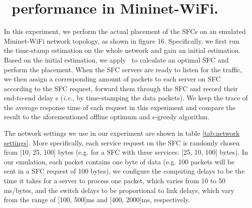


\section{\myalgorithm\ performance in Mininet-WiFi.}
\label{sec:mininetwifilearningbehavior}
In this experiment, we perform the actual placement of the SFCs on an emulated Mininet-WiFi network topology, as shown in figure 16. Specifically, we first run the time-stamp estimation on the whole network and gain an initial estimation. Based on the initial estimation, we apply \myalgorithm\ to calculate an optimal SFC and perform the placement. When the SFC servers are ready to listen for the traffic, we then assign a corresponding amount of packets to each server on SFC according to the SFC request, forward them through the SFC and record their end-to-end delay s (\textit{i.e.}, by time-stamping the data packets). We keep the trace of the average response time of each request in this experiment and compare the result to the aforementioned offline optimum and $\epsilon$-greedy algorithm. 

The network settings we use in our experiment are shown in table \ref{tab:network settings}. More specifically, each service request on the SFC is randomly chosen from [10, 25, 100] bytes (e.g. for a SFC with three services: [25, 10, 100] bytes). In our emulation, each packet contains one byte of data (e.g. 100 packets will be sent in a SFC request of 100 bytes), we configure the computing delays to be the time it takes for a server to process one packet, which varies from 10 to 50 ms/bytes, and the switch delays to be proportional to link delays, which vary from the range of [100, 500]ms and [400, 2000]ms, respectively.

